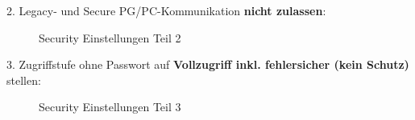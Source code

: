 \clearpage

2. Legacy- und Secure PG/PC-Kommunikation \textbf{nicht zulassen}:
\begin{figure}[H]
   \centering
   \caption[Security Einstellungen Teil 2]{Security Einstellungen Teil 2}
   \label{fig:Bild3.6}
\end{figure}

\clearpage

3. Zugriffstufe ohne Passwort auf \textbf{Vollzugriff inkl. fehlersicher (kein Schutz)} stellen:
\begin{figure}[H]
   \centering
   \caption[Security Einstellungen Teil 3]{Security Einstellungen Teil 3}
   \label{fig:Bild3.7}
\end{figure}


